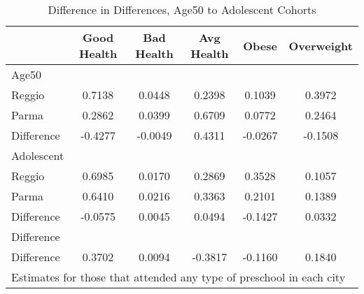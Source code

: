\begin{table}[htbp]\centering
\caption{Difference in Differences, Age50 to Adolescent Cohorts}
\begin{tabular}{l*{5}{c}}
\hline\hline
            & Good Health&  Bad Health&  Avg Health&       Obese&  Overweight\\
\hline
Age50       &            &            &            &            &            \\
Reggio      &      0.7138&      0.0448&      0.2398&      0.1039&      0.3972\\
Parma       &      0.2862&      0.0399&      0.6709&      0.0772&      0.2464\\
Difference  &     -0.4277&     -0.0049&      0.4311&     -0.0267&     -0.1508\\
\hline
Adolescent  &            &            &            &            &            \\
Reggio      &      0.6985&      0.0170&      0.2869&      0.3528&      0.1057\\
Parma       &      0.6410&      0.0216&      0.3363&      0.2101&      0.1389\\
Difference  &     -0.0575&      0.0045&      0.0494&     -0.1427&      0.0332\\
\hline
Difference  &            &            &            &            &            \\
Difference  &      0.3702&      0.0094&     -0.3817&     -0.1160&      0.1840\\
\hline\hline
\multicolumn{6}{l}{\footnotesize Estimates for those that attended any type of preschool in each city}\\
\end{tabular}
\end{table}
